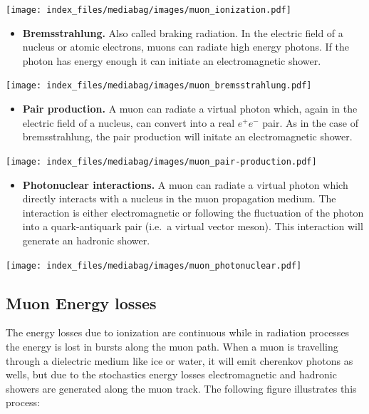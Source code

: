 \documentclass[
  letterpaper,
  DIV=11,
  numbers=noendperiod]{scrreprt}
\providecommand{\tightlist}{%
  \setlength{\itemsep}{0pt}\setlength{\parskip}{0pt}}\usepackage{longtable,booktabs,array}
\begin{document}
\begin{center}
\texttt{[image: index\_files/mediabag/images/muon\_ionization.pdf]}
\end{center}

\begin{itemize}
\tightlist
\item
  \textbf{Bremsstrahlung.} Also called braking radiation. In the
  electric field of a nucleus or atomic electrons, muons can radiate
  high energy photons. If the photon has energy enough it can initiate
  an electromagnetic shower.
\end{itemize}

\begin{center}
\texttt{[image: index\_files/mediabag/images/muon\_bremsstrahlung.pdf]}
\end{center}

\begin{itemize}
\tightlist
\item
  \textbf{Pair production.} A muon can radiate a virtual photon which,
  again in the electric field of a nucleus, can convert into a real
  \(e^+e^-\) pair. As in the case of bremsstrahlung, the pair production
  will initate an electromagnetic shower.
\end{itemize}

\begin{center}
\texttt{[image: index\_files/mediabag/images/muon\_pair-production.pdf]}
\end{center}

\begin{itemize}
\tightlist
\item
  \textbf{Photonuclear interactions.} A muon can radiate a virtual
  photon which directly interacts with a nucleus in the muon propagation
  medium. The interaction is either electromagnetic or following the
  fluctuation of the photon into a quark-antiquark pair (i.e.~a virtual
  vector meson). This interaction will generate an hadronic shower.
\end{itemize}

\begin{center}
\texttt{[image: index\_files/mediabag/images/muon\_photonuclear.pdf]}
\end{center}

\subsection{Muon Energy losses}\label{muon-energy-losses}

The energy losses due to ionization are continuous while in radiation
processes the energy is lost in bursts along the muon path. When a muon
is travelling through a dielectric medium like ice or water, it will
emit cherenkov photons as wells, but due to the stochastics energy
losses electromagnetic and hadronic showers are generated along the muon
track. The following figure illustrates this process:
\end{document}
